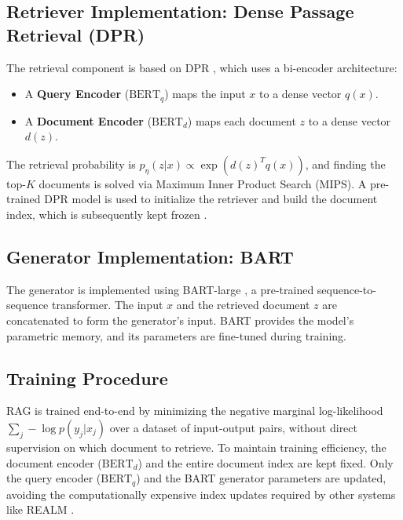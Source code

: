 \documentclass[a4paper,12pt]{article}
\begin{document}
\subsection{Retriever Implementation: Dense Passage Retrieval (DPR)}
The retrieval component is based on DPR \cite{karpukhin2020dpr}, which uses a bi-encoder architecture:
\begin{itemize}
    \item A \textbf{Query Encoder} ($\text{BERT}_q$) maps the input $x$ to a dense vector $q(x)$.
    \item A \textbf{Document Encoder} ($\text{BERT}_d$) maps each document $z$ to a dense vector $d(z)$.
\end{itemize}
The retrieval probability is $p_{\eta}(z|x) \propto \exp(d(z)^T q(x))$, and finding the top-$K$ documents is solved via Maximum Inner Product Search (MIPS). A pre-trained DPR model is used to initialize the retriever and build the document index, which is subsequently kept frozen \cite{lewis2020rag, karpukhin2020dpr}.

\subsection{Generator Implementation: BART}
The generator is implemented using BART-large \cite{lewis2019bart}, a pre-trained sequence-to-sequence transformer. The input $x$ and the retrieved document $z$ are concatenated to form the generator's input. BART provides the model's parametric memory, and its parameters are fine-tuned during training.

\subsection{Training Procedure}
RAG is trained end-to-end by minimizing the negative marginal log-likelihood $\sum_j -\log p(y_j | x_j)$ over a dataset of input-output pairs, without direct supervision on which document to retrieve. To maintain training efficiency, the document encoder ($\text{BERT}_d$) and the entire document index are kept fixed. Only the query encoder ($\text{BERT}_q$) and the BART generator parameters are updated, avoiding the computationally expensive index updates required by other systems like REALM \cite{lewis2020rag}.
\end{document}
